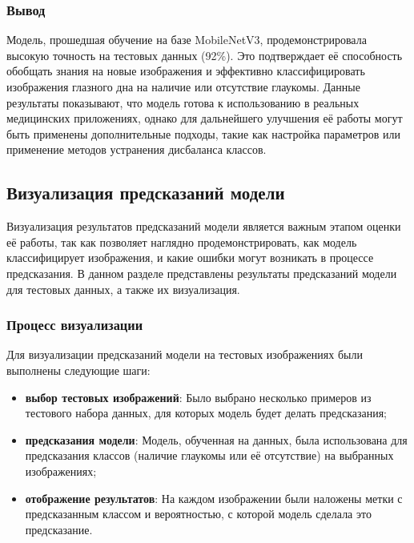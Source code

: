 {    \subsubsection*{Вывод}

    Модель, прошедшая обучение на базе MobileNetV3, продемонстрировала высокую точность на тестовых данных (92\%). Это подтверждает её способность обобщать знания на новые изображения и эффективно классифицировать изображения глазного дна на наличие или отсутствие глаукомы. Данные результаты показывают, что модель готова к использованию в реальных медицинских приложениях, однако для дальнейшего улучшения её работы могут быть применены дополнительные подходы, такие как настройка параметров или применение методов устранения дисбаланса классов.

    \vspace{13pt}
    \subsection{Визуализация предсказаний модели}

    Визуализация результатов предсказаний модели является важным этапом оценки её работы, так как позволяет наглядно продемонстрировать, как модель классифицирует изображения, и какие ошибки могут возникать в процессе предсказания. В данном разделе представлены результаты предсказаний модели для тестовых данных, а также их визуализация.

    \subsubsection*{Процесс визуализации}

    Для визуализации предсказаний модели на тестовых изображениях были выполнены следующие шаги:

    \begin{itemize}
        \item \textbf{выбор тестовых изображений}: Было выбрано несколько примеров из тестового набора данных, для которых модель будет делать предсказания;
        \item \textbf{предсказания модели}: Модель, обученная на данных, была использована для предсказания классов (наличие глаукомы или её отсутствие) на выбранных изображениях;
        \item \textbf{отображение результатов}: На каждом изображении были наложены метки с предсказанным классом и вероятностью, с которой модель сделала это предсказание.
    \end{itemize}

}
